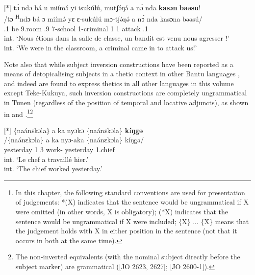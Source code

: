 \documentclass[output=paper,colorlinks,citecolor=brown
]{langscibook}
\begin{document}
\ea
[*]{
\label{criminaltheticVO}
\glll
{\db}tɔ́ ndɔ bá u miímə́ yi isukúlú, mutʃə́ŋə́ a nɔ́ nda \textbf{kasɔn} \textbf{bəəsu}! \\
/tɔ \textsuperscript{H}ndɔ bá ɔ miímə́ yɛ ɛ-sukúlú mɔ-tʃə́ŋə́ a nɔ́ nda kasɔna bəəsú/ \\
{\db}\SM{}.1\PL{} \PRS{} be \PREP{} 9.room \ASS{}.{}9 7-school 1-criminal 1\SM{} \PST{}1 \VEN{} attack \PRO{}.1\PL{} \\
\glt
int. `Nous étions dans la salle de classe, un bandit est venu nous agresser !' \\ int. `We were in the classroom, a criminal came in to attack us!' \jambox*{[EE+EB 2239] }
}

\z

Note also that while subject inversion constructions have been reported as a means of detopicalising subjects in a thetic context in other Bantu languages \citep{MartenvanderWal2014}, and indeed are found to express thetics in all other languages in this volume except Teke-Kukuya, such inversion constructions are completely ungrammatical in Tunen (regardless of the position of temporal and locative adjuncts), as shown in  and .\footnote{In this chapter, the following standard conventions are used for presentation of judgements: *(X) indicates that the sentence would be ungrammatical if X were omitted (in other words, X is obligatory); (*X) indicates that the sentence would be ungrammatical if X were included; $\{$X$\}$ ... $\{$X$\}$ means that the judgement holds with X in either position in the sentence (not that it occurs in both at the same time).}\footnote{The non-inverted equivalents (with the nominal subject directly before the subject marker) are grammatical ([JO 2623, 2627]; [JO 2600-1]).}

\ea
[*]{
\label{chiefinversion}
\glll
{\db}$\{$naánɛkɔla$\}$ a ka nyɔkɔ $\{$naánɛkɔla$\}$ \textbf{kíŋgə} \\
/$\{$naánɛkɔla$\}$ a ka nyɔ-aka $\{$naánɛkɔla$\}$ kíŋgə/ \\
{\db}yesterday 1\SM{} \PST{}3{} work-\DUR{} yesterday 1.chief \\
\glt
int. `Le chef a travaillé hier.' \\ int. `The chief worked yesterday.' \jambox*{[JO 2629--30] }
}

\z
\end{document}
